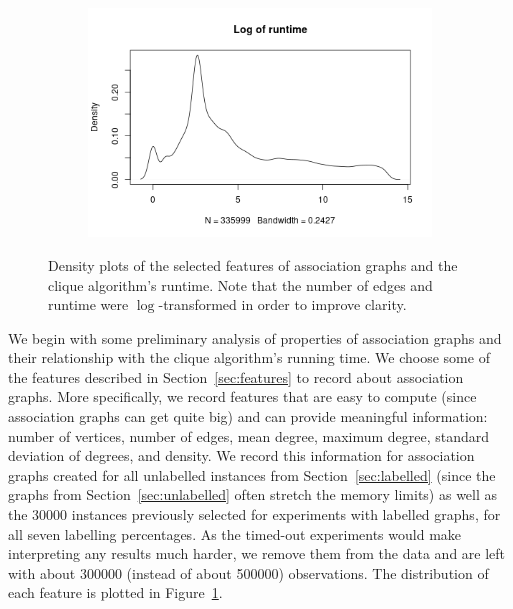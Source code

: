 \documentclass{l4proj}
\theoremstyle{definition}
\theoremstyle{remark}
\begin{document}
\begin{figure}
\begin{subfigure}[t]{0.49\textwidth}
  \end{subfigure}
  \begin{subfigure}[t]{0.49\textwidth}
    \centering
    \includegraphics[width=\textwidth]{images/time_density.png}
  \end{subfigure}
  \caption{Density plots of the selected features of association graphs and
    the clique algorithm's runtime. Note that the number of edges and runtime
    were $\log$-transformed in order to improve clarity.}
  \label{fig:densities}
\end{figure}

We begin with some preliminary analysis of properties of association graphs and
their relationship with the clique algorithm's running time. We choose some of
the features described in Section~\ref{sec:features} to record about association
graphs. More specifically, we record features that are easy to compute (since
association graphs can get quite big) and can provide meaningful information:
number of vertices, number of edges, mean degree, maximum degree, standard
deviation of degrees, and density. We record this information for association
graphs created for all unlabelled instances from Section~\ref{sec:labelled}
(since the graphs from Section~\ref{sec:unlabelled} often stretch the memory
limits) as well as the \num{30000} instances previously selected for experiments
with labelled graphs, for all seven labelling percentages. As the timed-out
experiments would make interpreting any results much harder, we remove them from
the data and are left with about \num{300000} (instead of about \num{500000})
observations. The distribution of each feature is plotted in
Figure~\ref{fig:densities}.
\end{document}
